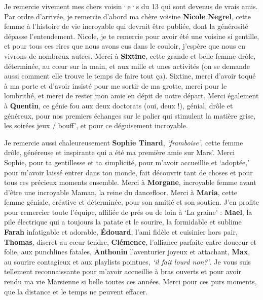 \documentclass[
  a4paper,12pt,twoside,onecolumn,openright,final,oldfontcommands]{memoir}
\begin{document}
Je remercie vivement mes chers voisin·e·s du 13 qui sont devenus de vrais amis. Par ordre d'arrivée, je remercie d'abord ma chère voisine \textbf{Nicole Negrel}, cette femme à l'histoire de vie incroyable qui devrait être publiée, dont la générosité dépasse l'entendement. Nicole, je te remercie pour avoir été une voisine si gentille, et pour tous ces rires que nous avons eus dans le couloir, j'espère que nous en vivrons de nombreux autres. Merci à \textbf{Sixtine}, cette grande et belle femme drôle, déterminée, au cœur sur la main, et aux mille et unes activités (on se demande aussi comment elle trouve le temps de faire tout ça). Sixtine, merci d'avoir toqué à ma porte et d'avoir insisté pour me sortir de ma grotte, merci pour le lombrithé, et merci de rester mon amie en dépit de notre départ. Merci également à \textbf{Quentin}, ce génie fou aux deux doctorats (oui, deux !), génial, drôle et généreux, pour nos premiers échanges sur le palier qui stimulent la matière grise, les soirées jeux / bouff', et pour ce déguisement incroyable.

Je remercie aussi chaleureusement \textbf{Sophie Tinard}, \emph{`framboise'}, cette femme drôle, généreuse et inspirante qui a été ma première amie sur Mars'. Merci Sophie, pour ta gentillesse et ta simplicité, pour m'avoir accueillie et `adoptée,' pour m'avoir laissé entrer dans ton monde, fait découvrir tant de choses et pour tous ces précieux moments ensemble. Merci à \textbf{Morgane}, incroyable femme avant d'être une incroyable Maman, la reine du dancefloor. Merci à \textbf{Maria}, cette femme géniale, créative et déterminée, pour son amitié et son soutien. J'en profite pour remercier toute l'équipe, affiliée de prés ou de loin à `La graine' : \textbf{Mael}, la pile électrique qui a toujours la patate et le sourire, la formidable et sublime \textbf{Farah} infatigable et adorable, \textbf{Édouard}, l'ami fidèle et cuisinier hors pair, \textbf{Thomas}, discret au cœur tendre, \textbf{Clémence}, l'alliance parfaite entre douceur et folie, aux punchlines fatales, \textbf{Anthonin} l'aventurier joyeux et attachant, \textbf{Max}, au sourire contagieux et aux playlists pointues, \emph{`il fait lourd non?'}. Je vous suis tellement reconnaissante pour m'avoir accueillie à bras ouverts et pour avoir rendu ma vie Marsienne si belle toutes ces années. Merci pour ces purs moments, que la distance et le temps ne peuvent effacer.
\end{document}
